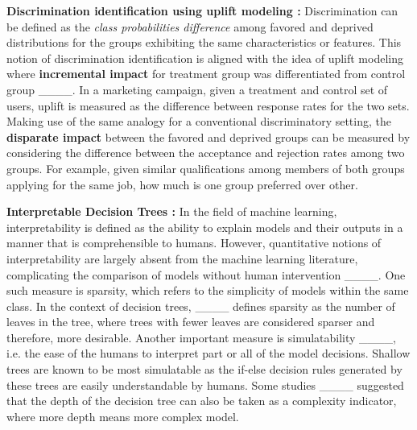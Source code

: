  \textbf{Discrimination identification using uplift modeling :} Discrimination can be defined as the {\it class probabilities difference} among favored and deprived distributions for the groups exhibiting the same characteristics or features. This notion of discrimination identification is aligned with the idea of uplift modeling where \textbf{incremental impact} for treatment group was differentiated from control group ____. In a marketing campaign, given a treatment and control set of users, uplift is measured as the difference between response rates for the two sets. Making use of the same analogy for a conventional discriminatory setting, the \textbf{disparate impact} between the favored and deprived groups can be measured by considering the difference between the acceptance and rejection rates among two groups. For example, given similar qualifications among members of both groups applying for the same job, how much is one group preferred over other.
 

 \textbf{Interpretable Decision Trees :} In the field of machine learning, interpretability is defined as the ability to explain models and their outputs in a manner that is comprehensible to humans. However, quantitative notions of interpretability are largely absent from the machine learning literature, complicating the comparison of models without human intervention ____. One such measure is sparsity, which refers to the simplicity of models within the same class. In the context of decision trees, ____ defines sparsity as the number of leaves in the tree, where trees with fewer leaves are considered sparser and therefore, more desirable. Another important measure is simulatability ____, i.e. the ease of the humans to interpret part or all of the model decisions. Shallow trees are known to be most simulatable as the if-else decision rules generated by these trees are easily understandable by humans. Some studies ____ suggested that the depth of the decision tree can also be taken as a complexity indicator, where more depth means more complex model.
